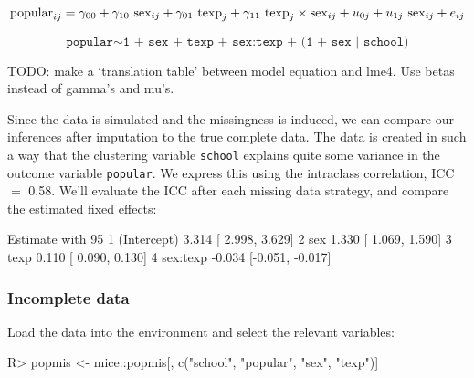 \documentclass[
]{jss}
\begin{document}
\[
\text{popular}_{ij} =
\gamma_{00} + 
\gamma_{10} \text{ sex}_{ij} + 
\gamma_{01} \text{ texp}_{j} + 
\gamma_{11} \text{ texp}_{j} \times \text{sex}_{ij} + 
u_{0j} + 
u_{1j} \text{ sex}_{ij} + 
e_{ij} \\
\]

\[
\texttt{popular} \sim  \texttt{1 + sex + texp + sex:texp + (1 + sex | school)}
\]

TODO: make a `translation table' between model equation and lme4. Use
betas instead of gamma's and mu's.

Since the data is simulated and the missingness is induced, we can
compare our inferences after imputation to the true complete data. The
data is created in such a way that the clustering variable
\texttt{school} explains quite some variance in the outcome variable
\texttt{popular}. We express this using the intraclass correlation, ICC
\(=\) 0.58. We'll evaluate the ICC after each missing data strategy, and
compare the estimated fixed effects:

\begin{CodeChunk}
\begin{CodeOutput}
                 Estimate with 95%
1 (Intercept)  3.314 [ 2.998,  3.629]
2         sex  1.330 [ 1.069,  1.590]
3        texp  0.110 [ 0.090,  0.130]
4    sex:texp -0.034 [-0.051, -0.017]
\end{CodeOutput}
\end{CodeChunk}

\hypertarget{incomplete-data}{%
\subsubsection{Incomplete data}\label{incomplete-data}}

Load the data into the environment and select the relevant variables:

\begin{CodeChunk}
\begin{CodeInput}
R> popmis <- mice::popmis[, c("school", "popular", "sex", "texp")] 
\end{CodeInput}
\end{CodeChunk}
\end{document}
